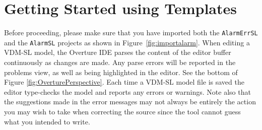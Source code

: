 \section{Getting Started using Templates}\label{sec:templates}

Before proceeding, please make sure that you have imported both the
\texttt{AlarmErrSL} and the \texttt{AlarmSL} projects as shown in
Figure~\ref{fig:importalarm}. 
When editing a VDM-SL model, the Overture IDE parses the content of the
editor buffer continuously as changes are made. Any parse errors will
be reported in the problems view, as well as being highlighted in the
editor. See the bottom of Figure
\ref{fig:OverturePerspective}. Each time a VDM-SL model file is
saved the editor type-checks the model and reports any errors or
warnings. Note also that the suggestions made in the error messages
may not always be entirely the action you may wish to take when
correcting the source since the tool cannot guess what you intended
to write.

